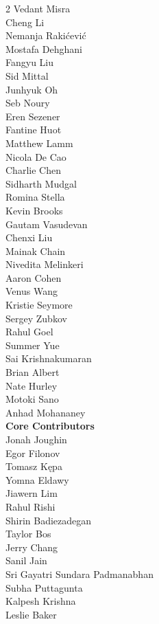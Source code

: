 \begin{multicols}{2}
Vedant Misra \\
Cheng Li \\
Nemanja Rakićević \\
Mostafa Dehghani \\
Fangyu Liu \\
Sid Mittal \\
Junhyuk Oh \\
Seb Noury \\
Eren Sezener \\
Fantine Huot \\
Matthew Lamm \\
Nicola De Cao \\
Charlie Chen \\
Sidharth Mudgal \\
Romina Stella \\
Kevin Brooks \\
Gautam Vasudevan \\
Chenxi Liu \\
Mainak Chain \\
Nivedita Melinkeri \\
Aaron Cohen \\
Venus Wang \\
Kristie Seymore \\
Sergey Zubkov \\
Rahul Goel \\
Summer Yue \\
Sai Krishnakumaran \\
Brian Albert \\
Nate Hurley \\
Motoki Sano \\
Anhad Mohananey \\
\noindent
\textbf{Core Contributors} \\
Jonah Joughin \\
Egor Filonov \\
Tomasz Kępa \\
Yomna Eldawy \\
Jiawern Lim \\
Rahul Rishi \\
Shirin Badiezadegan \\
Taylor Bos \\
Jerry Chang \\
Sanil Jain \\
Sri Gayatri Sundara Padmanabhan \\
Subha Puttagunta \\
Kalpesh Krishna \\
Leslie Baker \\

\end{multicols}
